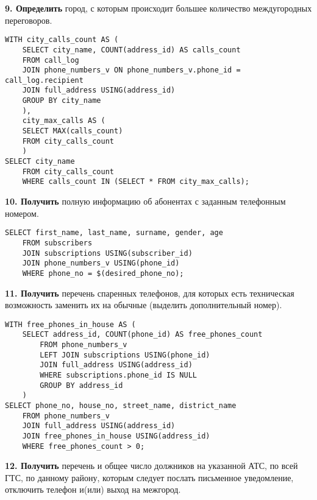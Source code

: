 \documentclass{report}
\begin{document}
\textbf{9. Определить} город, с которым происходит большее количество 
междугородных переговоров.

\begin{lstlisting}
WITH city_calls_count AS (
    SELECT city_name, COUNT(address_id) AS calls_count
    FROM call_log 
    JOIN phone_numbers_v ON phone_numbers_v.phone_id = call_log.recipient
    JOIN full_address USING(address_id)
    GROUP BY city_name
    ), 
    city_max_calls AS (
    SELECT MAX(calls_count)
    FROM city_calls_count 
    )
SELECT city_name
    FROM city_calls_count
    WHERE calls_count IN (SELECT * FROM city_max_calls);
\end{lstlisting}

\textbf{10. Получить} полную информацию об абонентах с заданным телефонным номером.

\begin{lstlisting}
SELECT first_name, last_name, surname, gender, age
    FROM subscribers
    JOIN subscriptions USING(subscriber_id)
    JOIN phone_numbers_v USING(phone_id)
    WHERE phone_no = $(desired_phone_no);
\end{lstlisting}

\textbf{11. Получить} перечень спаренных телефонов, для которых есть 
техническая возможность заменить их на обычные (выделить дополнительный номер).

\begin{lstlisting}
WITH free_phones_in_house AS (
    SELECT address_id, COUNT(phone_id) AS free_phones_count
        FROM phone_numbers_v
        LEFT JOIN subscriptions USING(phone_id)
        JOIN full_address USING(address_id)
        WHERE subscriptions.phone_id IS NULL
        GROUP BY address_id
    )
SELECT phone_no, house_no, street_name, district_name
    FROM phone_numbers_v
    JOIN full_address USING(address_id)
    JOIN free_phones_in_house USING(address_id)
    WHERE free_phones_count > 0;
\end{lstlisting}

\textbf{12. Получить} перечень и общее число должников на указанной АТС, 
по всей ГТС, по данному району, которым следует послать письменное уведомление, 
отключить телефон и(или) выход на межгород.

\begin{lstlisting}

\end{lstlisting}
\end{document}
